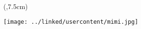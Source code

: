 \begin{textblock*}{\textwidth}(\border,7.5cm)
\begin{center}
\noindent
\texttt{[image: ../linked/usercontent/mimi.jpg]} \\
\end{center}
\end{textblock*}

\vspace*{17.9cm}
